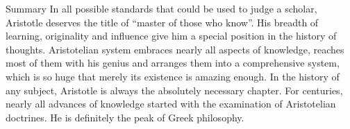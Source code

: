 \documentclass[11pt]{article}
\begin{document}
Summary
  In all possible standards that could be used to judge a scholar, Aristotle deserves the title of “master of those who know”. His breadth of learning, originality and influence give him a special position in the history of thoughts. Aristotelian system embraces nearly all aspects of knowledge, reaches most of them with his genius and arranges them into a comprehensive system, which is so huge that merely its existence is amazing enough. In the history of any subject, Aristotle is always the absolutely necessary chapter. For centuries, nearly all advances of knowledge started with the examination of Aristotelian doctrines. He is definitely the peak of Greek philosophy.
\end{document}
